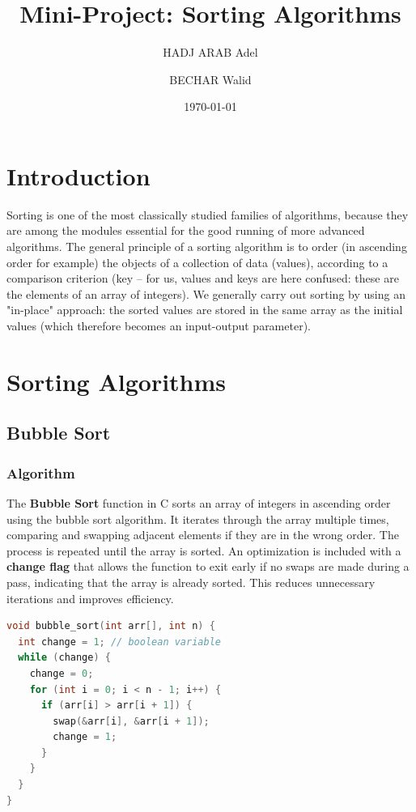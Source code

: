 \documentclass{article}
\title{Mini-Project: Sorting Algorithms}
\author{HADJ ARAB Adel \and BECHAR Walid}
\date{\today}
\begin{document}
\maketitle

\section{Introduction}
Sorting is one of the most classically studied families of algorithms, because they are among the modules essential for the good running of more advanced algorithms. The general principle of a sorting algorithm is to order (in ascending order for example) the objects of a collection of data (values), according to a comparison criterion (key – for us, values and keys are here confused: these are the elements of an array of integers). We generally carry out sorting by using an "in-place" approach: the sorted values are stored in the same array as the initial values (which therefore becomes an input-output parameter).

\section{Sorting Algorithms}

\subsection{Bubble Sort}

\subsubsection{Algorithm}
The \textbf{Bubble Sort} function in C sorts an array of integers in ascending order using the bubble sort algorithm. It iterates through the array multiple times, comparing and swapping adjacent elements if they are in the wrong order. The process is repeated until the array is sorted. An optimization is included with a \textbf{change flag} that allows the function to exit early if no swaps are made during a pass, indicating that the array is already sorted. This reduces unnecessary iterations and improves efficiency.

\newpage
\begin{lstlisting}[language=C, caption=Bubble Sort implementation]
void bubble_sort(int arr[], int n) {
  int change = 1; // boolean variable
  while (change) {
    change = 0;
    for (int i = 0; i < n - 1; i++) {
      if (arr[i] > arr[i + 1]) {
        swap(&arr[i], &arr[i + 1]);
        change = 1;
      }
    }
  }
}
\end{lstlisting}
\end{document}
